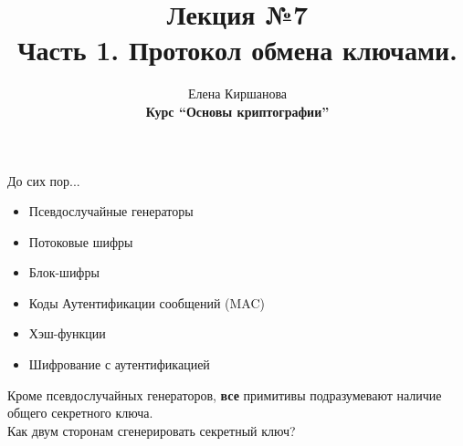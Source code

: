 \documentclass[usenames,dvipsnames,8pt,aspectratio=169]{beamer}
\title{Лекция №7 \\[10pt]
	Часть 1. Протокол обмена ключами.}
\date{ Елена Киршанова \\  \textbf{Курс ``Основы криптографии''} \\  }
\begin{document}
	
\begin{frame}
	\titlepage
\end{frame}

\begin{frame}{До сих пор...}
	\Large 
	\begin{itemize}
		\item  {\color{Orange}Псевдослучайные генераторы} 
		\item {\color{Orange} Потоковые шифры} 
		\item {\color{Orange} Блок-шифры } 
		\item {\color{Orange} Коды Аутентификации сообщений (MAC)}
		\item {\color{Orange} Хэш-функции}  
		\item {\color{Orange} Шифрование с аутентификацией }  
	\end{itemize}

\vspace{10pt}
\centering
 
Кроме псевдослучайных генераторов, \textbf{все} примитивы подразумевают наличие {\color{Orange} общего секретного  ключа.}\\[10pt]
Как двум сторонам сгенерировать секретный ключ? \\[10pt]



\end{frame}
\end{document}
